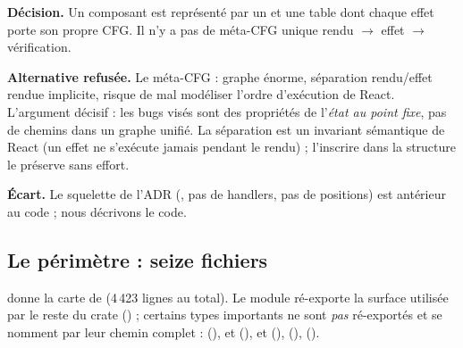 \begin{decision}
\textbf{Décision.} Un composant est représenté par un  et une table  dont chaque effet porte son propre CFG. Il n'y a pas de méta-CFG unique \og rendu $\to$ effet $\to$ vérification\fg{}.

\textbf{Alternative refusée.} Le méta-CFG : graphe énorme, séparation rendu/effet rendue implicite, risque de mal modéliser l'ordre d'exécution de React. L'argument décisif : les bugs visés sont des propriétés de l'\emph{état au point fixe}, pas de chemins dans un graphe unifié. La séparation est un invariant sémantique de React (un effet ne s'exécute jamais pendant le rendu) ; l'inscrire dans la structure le préserve sans effort.

\textbf{Écart.} Le squelette de l'ADR (, pas de handlers, pas de positions) est antérieur au code ; nous décrivons le code.
\end{decision}

\subsection{Le périmètre : seize fichiers}

 donne la carte de  (4\,423 lignes au total). Le module  ré-exporte la surface utilisée par le reste du crate () ; certains types importants ne sont \emph{pas} ré-exportés et se nomment par leur chemin complet :  (),  et  (),  et  (),  (),  ().

